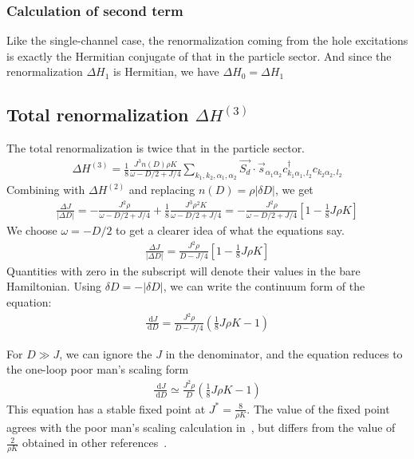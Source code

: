 \documentclass[12pt]{revtex4-2}
\begin{document}
\subsubsection{Calculation of second term}
Like the single-channel case, the renormalization coming from the hole excitations is exactly the Hermitian conjugate of that in the particle sector. And since the renormalization \(\Delta H_1\) is Hermitian, we have \(\Delta H_0 = \Delta H_1\)

\subsection{Total renormalization \(\Delta H^{(3)}\)}
The total renormalization is twice that in the particle sector.
\begin{align}
	\Delta H^{(3)} = \frac{1}{8}\frac{J^3 n(D) \rho K}{\omega - D/2 + J/4} \sum_{k_1,k_2,\alpha_1,\alpha_2} \vec{S_d}\cdot\vec{s}_{\alpha_1 \alpha_2} c^\dagger_{k_1\alpha_1,l_2}c_{k_2 \alpha_2,l_2}
\end{align}
Combining with \(\Delta H^{(2)}\) and replacing \(n(D) = \rho |\delta D|\), we get
\begin{align}
	\frac{\Delta J}{|\Delta D|} = -\frac{J^2 \rho}{\omega - D/2 + J/4} + \frac{1}{8}\frac{J^3 \rho^2 K}{\omega - D/2 + J/4} = -\frac{J^2 \rho}{\omega - D/2 + J/4}\left[1 - \frac{1}{8}J\rho K\right] 
\end{align}
We choose \(\omega = -D/2\) to get a clearer idea of what the equations say. 
\begin{align}
	\label{mchannel}
	\frac{\Delta J}{|\Delta D|} = \frac{J^2 \rho}{D - J/4}\left[1 - \frac{1}{8}J\rho K\right] 
\end{align}
Quantities with zero in the subscript will denote their values in the bare Hamiltonian. Using \(\delta D = -|\delta D|\), we can write the continuum form of the equation:
\begin{align}
	\label{rg_beta}
	\frac{\:\mathrm{d}J}{\:\mathrm{d}D} = \frac{J^2 \rho}{D - J/4}\left(\frac{1}{8}J\rho K - 1\right)
\end{align}

For \(D \gg J\), we can ignore the \(J\) in the denominator, and the equation reduces to the one-loop poor man's scaling form
\begin{align}
	\label{pms_mchannel}
	\frac{\:\mathrm{d}J}{\:\mathrm{d}D} \simeq  \frac{J^2 \rho}{D}\left(\frac{1}{8}J\rho K - 1\right)
\end{align}
This equation has a stable fixed point at \(J^* = \frac{8}{\rho K}\). The value of the fixed point agrees with the poor man's scaling calculation in~\cite{tripathi2018landau}, but differs from the value of \(\frac{2}{\rho K}\) obtained in other references~\cite{Kuramoto1998,Kogan_2018}.
\end{document}
